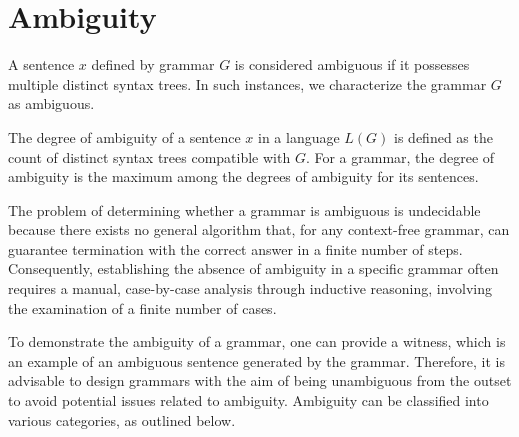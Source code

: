 \section{Ambiguity}

\begin{definition}
    A sentence $x$ defined by grammar $G$ is considered ambiguous if it possesses multiple distinct syntax trees. 
    In such instances, we characterize the grammar $G$ as ambiguous.
\end{definition}
\begin{definition}
    The degree of ambiguity of a sentence $x$ in a language $L(G)$ is defined as the count of distinct syntax trees compatible with $G$.
    For a grammar, the degree of ambiguity is the maximum among the degrees of ambiguity for its sentences.
\end{definition}
The problem of determining whether a grammar is ambiguous is undecidable because there exists no general algorithm that, for any context-free grammar, can guarantee termination with the correct answer in a finite number of steps.
Consequently, establishing the absence of ambiguity in a specific grammar often requires a manual, case-by-case analysis through inductive reasoning, involving the examination of a finite number of cases.

To demonstrate the ambiguity of a grammar, one can provide a witness, which is an example of an ambiguous sentence generated by the grammar.
Therefore, it is advisable to design grammars with the aim of being unambiguous from the outset to avoid potential issues related to ambiguity. 
Ambiguity can be classified into various categories, as outlined below.

